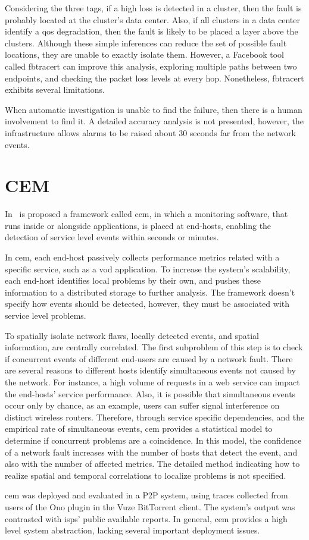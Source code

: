 Considering the three tags, if a high loss is detected in a cluster,
then the fault is probably located at the cluster's data center.
Also, if all clusters in a data center identify a \gls*{qos} degradation,
then the fault is likely to be placed a layer above the clusters.
Although these simple inferences can reduce the set of possible fault locations,
they are unable to exactly isolate them.
However, a Facebook tool called fbtracert
can improve this analysis, exploring multiple
paths between two endpoints, and checking the
packet loss levels at every hop. Nonetheless, fbtracert exhibits several
limitations.

When automatic investigation is unable to find the failure, then there
is a human involvement to find it. A detailed accuracy analysis is not
presented, however, the infrastructure allows alarms to be raised about 30
seconds far from the network events.

\section{CEM}

In~\cite{crowdsourcing_service_level_network_event_monitoring} is proposed a
framework called \gls*{cem}, in which a
monitoring software, that runs inside or alongside applications, is placed at
end-hosts, enabling the detection of service level events within seconds or
minutes.

In \gls*{cem}, each end-host passively collects performance metrics related with
a specific service, such as a \gls*{vod} application.
To increase the system's scalability,
each end-host identifies local problems by their own,
and pushes these information to a distributed storage to further analysis.
The framework doesn't specify how events should be detected,
however, they must be associated with service level problems.

To spatially isolate network flaws, locally detected events, and spatial
information, are centrally correlated.
The first subproblem of this step is to check if concurrent events
of different end-users are caused by a
network fault. There are several reasons to different hosts identify
simultaneous events not caused by the network.
For instance, a high volume of requests in a web service can impact the
end-hosts' service performance. Also, it is
possible that simultaneous events occur only by chance, as an example, users
can suffer signal interference on distinct wireless routers.
Therefore, through service specific dependencies, and the empirical rate of
simultaneous
events, \gls*{cem} provides a statistical model to determine if
concurrent problems are a coincidence.
In this model, the confidence of a network fault increases with the
number of hosts that detect the event, and also with the number of affected
metrics.
The detailed method indicating how to realize spatial and temporal
correlations to
localize problems is not specified.

\gls*{cem} was deployed and evaluated in a P2P system, using traces
collected
from users of the Ono plugin in the Vuze BitTorrent client. The system's
output was contrasted with \glspl*{isp}' public available reports. In general,
\gls*{cem} provides a high level system abstraction, lacking several
important deployment issues.
